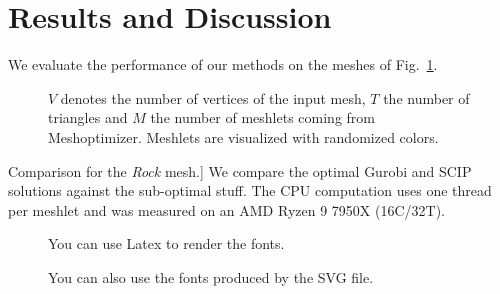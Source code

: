 \section{Results and Discussion}\label{Sec:Evaluation}

We evaluate the performance of our methods on the meshes of Fig.~\ref{fig:meshes}.
    
\begin{figure}
    \centering%
    \def\svgwidth{\textwidth}%
    \fontsize{6pt}{5pt}\selectfont%
    \caption[Test Meshes]{
    $V$ denotes the number of vertices of the input mesh, $T$ the number of triangles and $M$ the number of meshlets coming from Meshoptimizer.
    Meshlets are visualized with randomized colors.
    }\label{fig:meshes}%
\end{figure}%

\begin{table}
    \caption
    [Comparison for the \textit{Rock} mesh.]
    {    
    We compare the optimal Gurobi and SCIP solutions against the sub-optimal stuff.
    The CPU computation uses one thread per meshlet and was measured on an AMD Ryzen 9 7950X (16C/32T).    
    }\label{tab:StripifyTable}    
    {
    \centering    
    
    }
\end{table}


\begin{figure}
    
    \caption[Vector graphics with fonts rendered by latex]{You can use Latex to render the fonts.}\label{fig:latexfonts}
\end{figure}

\begin{figure}
    
    \caption[Vector graphics with fonts directly taken from the file]{You can also use the fonts produced by the SVG file.}\label{fig:svgfonts}
\end{figure}

